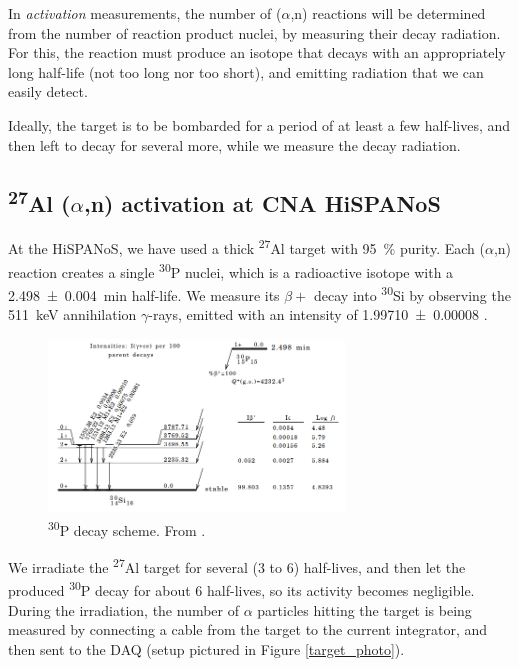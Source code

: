 \documentclass[a4paper,12pt]{report}
\newcommand{\an}{($\alpha$,n) }
\newcommand{\Aliso}{\textsuperscript{27}Al }
\newcommand{\Piso}{\textsuperscript{30}P }
\begin{document}
In \textit{activation} measurements, the number of \an reactions will be determined from the number of reaction product nuclei, by measuring their decay radiation.
For this, the reaction must produce an isotope that decays with an appropriately long half-life (not too long nor too short), and emitting radiation that we can easily detect.

Ideally, the target is to be bombarded for a period of at least a few half-lives, and then left to decay for several more, while we measure the decay radiation.

\subsection{\Aliso\an activation at CNA HiSPANoS}
At the HiSPANoS, we have used a thick \Aliso target with \qty{95}{\percent} purity.
Each \an reaction creates a single \Piso nuclei, which is a radioactive isotope with a \qty{2.498(4)}{\minute} half-life.
We measure its $\beta +$ decay into \textsuperscript{30}Si by observing the \qty{511}{\keV} annihilation $\gamma$-rays, emitted with an intensity of \num{1.99710(8)} \cite{nucleardatasheets}.

\begin{figure}[H]
	\centering
	\includegraphics[width=0.7\textwidth]{Piso_decay_scheme.png}
	\caption{\Piso decay scheme.
	From \cite{nucleardatasheets}.}
	\label{Piso_decay_scheme}
\end{figure}

We irradiate the \Aliso target for several (3 to 6) half-lives, and then let the produced \Piso decay for about 6 half-lives, so its activity becomes negligible.
During the irradiation, the number of $\alpha$ particles hitting the target is being measured by connecting a cable from the target to the current integrator, and then sent to the DAQ (setup pictured in Figure \ref{target_photo}).
\end{document}

